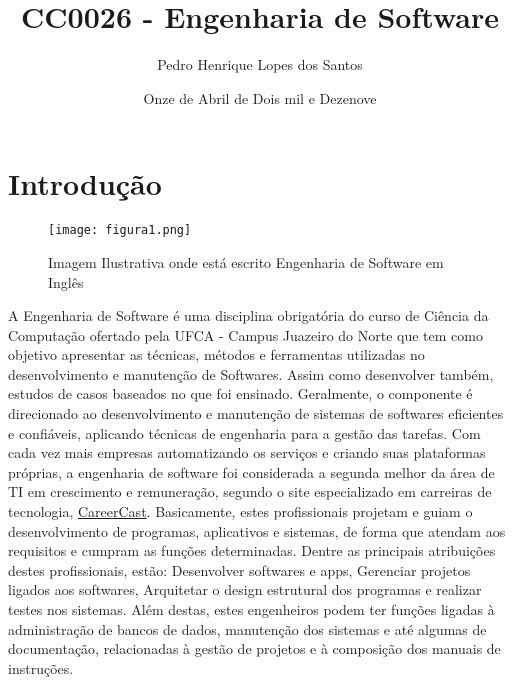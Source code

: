 \documentclass[10pt]{article}
\title{CC0026 - Engenharia de Software}
\author{Pedro Henrique Lopes dos Santos}
\date{Onze de Abril de Dois mil e Dezenove}
\begin{document}
\maketitle

\section{Introdução}
  \begin{figure}[!htb]
    \centering
    \texttt{[image: figura1.png]}
    \caption{Imagem Ilustrativa onde está escrito Engenharia de Software em Inglês}
    \label{fig1}
  \end{figure}
    A Engenharia de Software é uma disciplina obrigatória do curso de Ciência da Computação ofertado pela 
UFCA - Campus Juazeiro do Norte que tem como objetivo apresentar as técnicas, métodos e ferramentas utilizadas no desenvolvimento e manutenção de  Softwares. \cite{PPCcc3} Assim como desenvolver também, estudos de casos baseados no que foi ensinado. Geralmente, o componente é direcionado ao desenvolvimento e manutenção de sistemas de softwares eficientes e confiáveis, aplicando técnicas de engenharia para a gestão das tarefas.
    Com cada vez mais empresas automatizando os serviços e criando suas plataformas próprias, a
engenharia de software foi considerada a segunda melhor da área de TI em crescimento e remuneração, segundo o site especializado em carreiras de tecnologia, \href{https://it.careercast.com/jobs-rated/2017-best-jobs-it?page=1}{CareerCast}.
\cite{eng2}
    Basicamente, estes profissionais projetam e guiam o desenvolvimento de programas, aplicativos e
sistemas, de forma que atendam aos requisitos e cumpram as funções determinadas.
    Dentre as principais atribuições destes profissionais, estão: Desenvolver softwares e apps, Gerenciar
projetos ligados aos softwares, Arquitetar o design estrutural dos programas e realizar testes nos sistemas. 
Além destas, estes engenheiros podem ter funções ligadas à administração de bancos de dados, manutenção dos sistemas e até algumas de documentação, relacionadas à gestão de projetos e à composição dos manuais de instruções. \cite{eng1}
\end{document}
